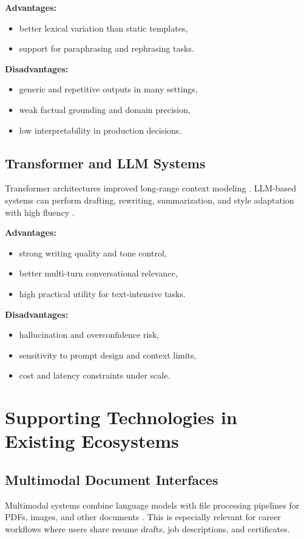 \documentclass[conference]{IEEEtran}
\begin{document}
\textbf{Advantages:}
\begin{itemize}
    \item better lexical variation than static templates,
    \item support for paraphrasing and rephrasing tasks.
\end{itemize}

\textbf{Disadvantages:}
\begin{itemize}
    \item generic and repetitive outputs in many settings,
    \item weak factual grounding and domain precision,
    \item low interpretability in production decisions.
\end{itemize}

\subsection{Transformer and LLM Systems}
Transformer architectures improved long-range context modeling \cite{vaswani2017}. LLM-based systems can perform drafting, rewriting, summarization, and style adaptation with high fluency \cite{thoppilan2022}.

\textbf{Advantages:}
\begin{itemize}
    \item strong writing quality and tone control,
    \item better multi-turn conversational relevance,
    \item high practical utility for text-intensive tasks.
\end{itemize}

\textbf{Disadvantages:}
\begin{itemize}
    \item hallucination and overconfidence risk,
    \item sensitivity to prompt design and context limits,
    \item cost and latency constraints under scale.
\end{itemize}

\section{Supporting Technologies in Existing Ecosystems}
\subsection{Multimodal Document Interfaces}
Multimodal systems combine language models with file processing pipelines for PDFs, images, and other documents \cite{baltrusaitis2019,lu2019}. This is especially relevant for career workflows where users share resume drafts, job descriptions, and certificates.
\end{document}
